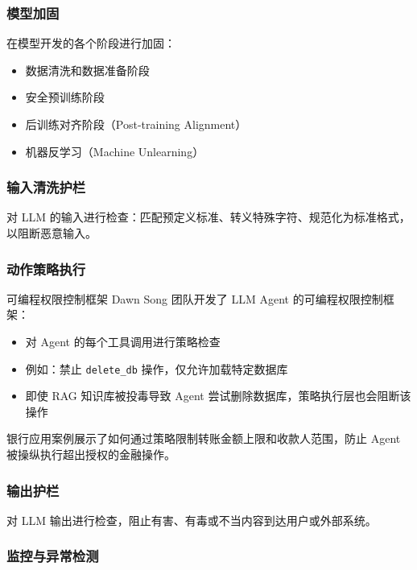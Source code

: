 \documentclass[a4paper]{article}
\begin{document}
\subsubsection{模型加固}

在模型开发的各个阶段进行加固：
\begin{itemize}
    \item 数据清洗和数据准备阶段
    \item 安全预训练阶段
    \item 后训练对齐阶段（Post-training Alignment）
    \item 机器反学习（Machine Unlearning）
\end{itemize}

\subsubsection{输入清洗护栏}

对 LLM 的输入进行检查：匹配预定义标准、转义特殊字符、规范化为标准格式，以阻断恶意输入。

\subsubsection{动作策略执行}

\begin{importantbox}{可编程权限控制框架}
Dawn Song 团队开发了 LLM Agent 的可编程权限控制框架：
\begin{itemize}
    \item 对 Agent 的每个工具调用进行策略检查
    \item 例如：禁止 \texttt{delete\_db} 操作，仅允许加载特定数据库
    \item 即使 RAG 知识库被投毒导致 Agent 尝试删除数据库，策略执行层也会阻断该操作
\end{itemize}
\end{importantbox}

银行应用案例展示了如何通过策略限制转账金额上限和收款人范围，防止 Agent 被操纵执行超出授权的金融操作。

\subsubsection{输出护栏}

对 LLM 输出进行检查，阻止有害、有毒或不当内容到达用户或外部系统。

\subsubsection{监控与异常检测}
\end{document}
